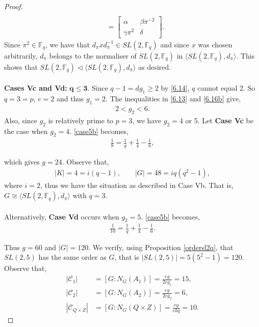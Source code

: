 \begin{proof}
\begin{align*}
\\[1.5ex] &= \begin{bmatrix} \alpha & \beta \pi^{-2} \\ \gamma \pi^{2} & \delta \end{bmatrix}. 
\end{align*}
Since $\pi^2 \in \mathbb{F}_q$, we have that $d_\pi x d_\pi^{-1} \in SL(2,\mathbb{F}_q)$ and since $x$ was chosen arbitrarily, $d_\pi$ belongs to the normaliser of $SL(2,\mathbb{F}_q)$ in $\langle SL(2,\mathbb{F}_q), d_\pi \rangle$. This shows that $SL(2,\mathbb{F}_q) \vartriangleleft \langle SL(2,\mathbb{F}_q), d_\pi \rangle$ as desired. \\
\\
 \space \textbf{Cases Vc and Vd:} $\pmb{q \leq 3}$. Since $q - 1 = d g_1 \geq 2$ by \eqref{6.14}, $q$ cannot equal 2. So $q = 3 = p$, $e = 2$ and thus $g_1 = 2$. The inequalities in \eqref{6.13} and \eqref{6.16b} give,
\begin{align*} 2 < g_2 < 6.
\end{align*}
Also, since $g_2$ is relatively prime to $p=3$, we have $g_2 = 4$ or 5. Let \textbf{Case Vc} be the case when $g_2 = 4$. \eqref{case5b} becomes,
\begin{align*} \frac{1}{8} = \frac{1}{g} + \frac{1}{4} - \frac{1}{6},
\end{align*}

which gives $g = 24$. Observe that,
\begin{align*} |K| = 4 = i(q-1), \qquad |G| = 48 = iq(q^2-1),
\end{align*}
where $i=2$, thus we have the situation as described in Case Vb. That is, $G \cong \langle SL(2,\mathbb{F}_q), d_\pi \rangle$ with $q=3$.\\
\\
Alternatively, \textbf{Case Vd} occurs when $g_2 = 5$. \eqref{case5b} becomes,
\begin{align*} \frac{1}{10} = \frac{1}{g} + \frac{1}{4} - \frac{1}{6}.
\end{align*}

Thus $g = 60 $ and $|G| = 120$. We verify, using Proposition \ref{ordersl2q}, that $SL(2,5)$ has the same order as $G$, that is $|SL(2,5)| = 5(5^2-1) =120$. Observe that,
\begin{align*} |\mathcal{C}_1| &= [G : N_G(A_1)] = \frac{eg}{2eg_1} = 15,
\\[1ex] |\mathcal{C}_2| &= [G : N_G(A_2)] = \frac{eg}{2eg_2} = 6,
\\[1ex] |\mathcal{C}_{Q \times Z}| &= [G : N_G(Q \times Z)] = \frac{eg}{ekq} = 10.
\end{align*}


\end{proof}

